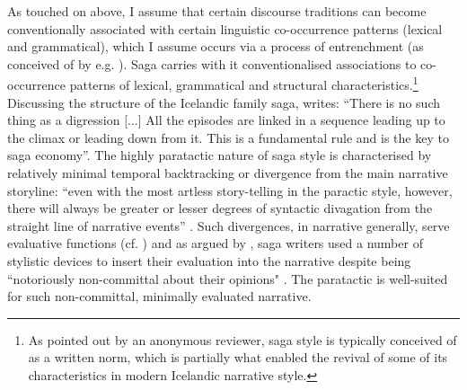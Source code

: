 \documentclass[output=paper,colorlinks,citecolor=brown]{langscibook}
\begin{document}
As touched on above, I assume that certain discourse traditions can become conventionally associated with certain linguistic co-occurrence patterns \citep{kabatek2024} (lexical and grammatical), which I assume occurs via a process of entrenchment (as conceived of by e.g. \citeauthor{schmid2015} \citeyear{schmid2015}). Saga  carries with it conventionalised associations to co-occurrence patterns of lexical, grammatical and structural characteristics.\footnote{As pointed out by an anonymous reviewer, saga style is typically conceived of as a written norm, which is partially what enabled the revival of some of its characteristics in modern Icelandic narrative style.} Discussing the structure of the Icelandic family saga, \citet[33]{andersson1967} writes: ``There is no such thing as a digression [...] All the episodes are linked in a sequence leading up to the climax or leading down from it. This is a fundamental rule and is the key to saga economy''. The highly paratactic nature of saga style is characterised by relatively minimal temporal backtracking or divergence from the main narrative storyline: ``even with the most artless story-telling in the paractic style, however, there will always be greater or lesser degrees of syntactic divagation from the straight line of narrative events'' \citep[392]{amory1980narrative}. Such divergences, in narrative generally, serve evaluative functions (cf. \citeauthor{LabovWaletzky1967} \citeyear[26--35]{LabovWaletzky1967}) and as argued by \citet{amory1980narrative}, saga writers used a number of stylistic devices to insert their evaluation into the narrative despite being ``notoriously non-committal about their opinions" \citep[394]{amory1980narrative}. The paratactic  is well-suited for such non-committal, minimally evaluated narrative.
\end{document}
